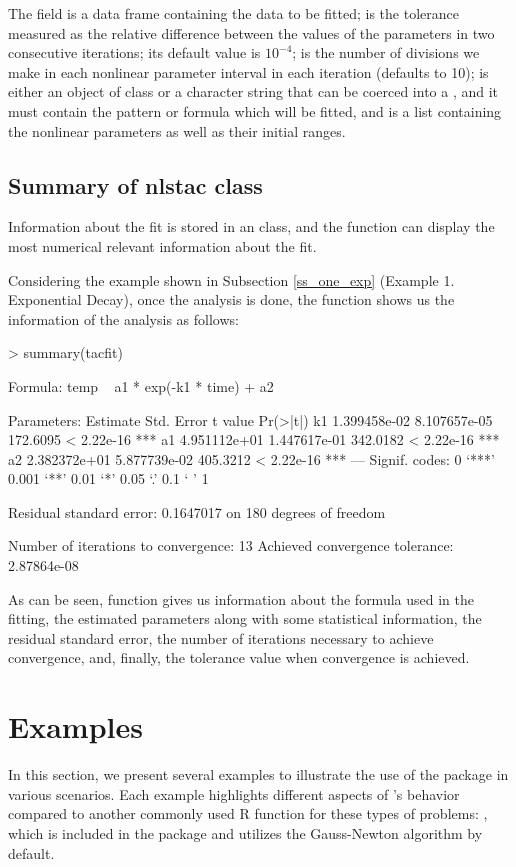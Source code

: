 The  field is a data frame containing  the data to be fitted;  is the tolerance measured as the relative difference between the values of the parameters in two consecutive iterations; its  default value is $10^{-4}$;  is the number of divisions we make in each nonlinear parameter interval in each iteration (defaults to 10);  is either an object of  class or a character string that can be coerced into a , and it  must contain the pattern or formula which will be fitted, and  is a list containing the nonlinear parameters as well as their initial ranges. 


\subsection{Summary of nlstac class} \label{s_summary}
Information about the fit is stored in an  class, and the function  can display the most numerical relevant information about the fit.

Considering the example shown in Subsection \ref{ss_one_exp} (Example 1. Exponential Decay), once the analysis is done, the  function shows us the information of the analysis as follows:
\begin{example}
  > summary(tacfit)

Formula: temp ~ a1 * exp(-k1 * time) + a2

Parameters:
       Estimate   Std. Error  t value   Pr(>|t|)    
k1 1.399458e-02 8.107657e-05 172.6095 < 2.22e-16 ***
a1 4.951112e+01 1.447617e-01 342.0182 < 2.22e-16 ***
a2 2.382372e+01 5.877739e-02 405.3212 < 2.22e-16 ***
---
Signif. codes:  0 ‘***’ 0.001 ‘**’ 0.01 ‘*’ 0.05 ‘.’ 0.1 ‘ ’ 1

Residual standard error: 0.1647017 on 180 degrees of freedom

Number of iterations to convergence:  13
Achieved convergence tolerance:  2.87864e-08
\end{example}


As can be seen, function  gives us information about the formula used in the fitting, the estimated parameters along with some statistical information, the residual standard error, the number of iterations necessary to achieve convergence, and, finally, the tolerance value when convergence is achieved.



\section{Examples}
In this section, we present several examples to illustrate the use of the  package in various scenarios. Each example highlights different aspects of 's behavior compared to another commonly used R function for these types of problems: , which is included in the  package and utilizes the Gauss-Newton algorithm by default.

